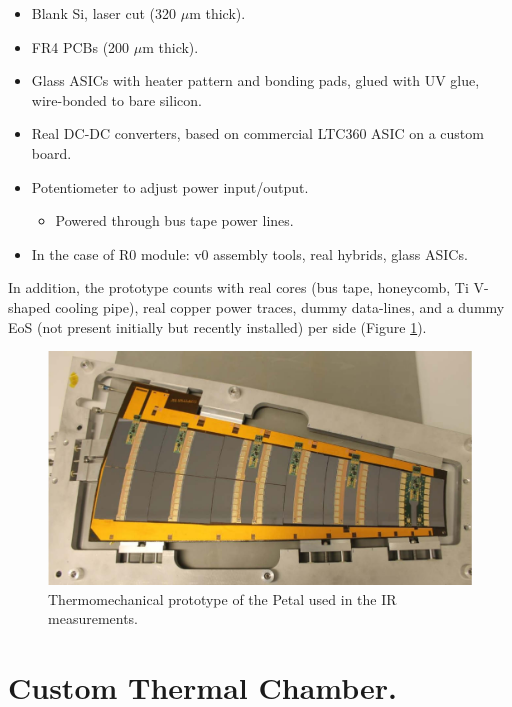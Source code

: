 		\begin{itemize}
			\renewcommand{\labelitemi}{$\diamond$}
			\item Blank Si, laser cut (320 $\mu$m thick).
			\item FR4 PCBs (200 $\mu$m thick).
			\item Glass ASICs with heater pattern and bonding pads, glued with UV glue, wire-bonded to bare silicon.
			\item Real DC-DC converters, based on commercial LTC360 ASIC on a custom board.
			\item Potentiometer to adjust power input/output.
			\begin{itemize}
			\renewcommand{\labelitemi}{$\bullet$}
				\item Powered through bus tape power lines.
			\end{itemize}
			\item In the case of R0 module: v0 assembly tools, real hybrids, glass ASICs.
		\end{itemize}
		
		In addition, the prototype counts with real cores (bus tape, honeycomb, Ti V-shaped cooling pipe), real copper power traces, dummy data-lines, and a dummy EoS (not present initially but recently installed) per side (Figure \ref{fig2.2}).
		
		\begin{figure}[ht!]
			\centering
			\captionsetup{justification=centering,margin=2cm}
			\includegraphics[scale=0.35]{Figures/Chapter02/PetalConstruction.jpg}
			\caption{Thermomechanical prototype of the Petal  used in the IR measurements.}\label{fig2.2}
		\end{figure}\bigskip
		
	\section{Custom Thermal Chamber. }\label{section2.2}
	
